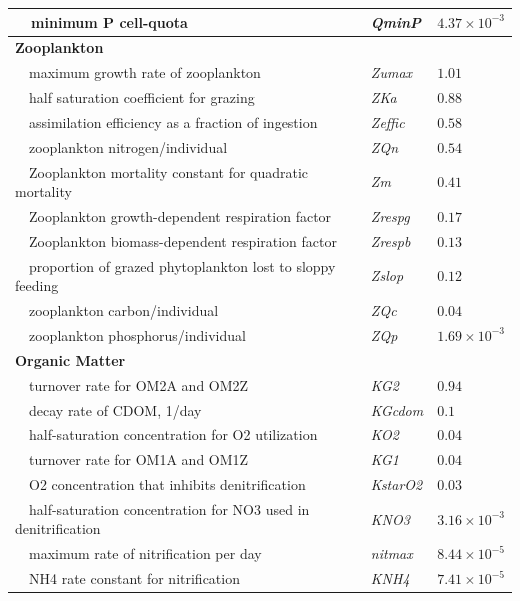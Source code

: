 \documentclass[preprint]{elsarticle}\usepackage[]{graphicx}\usepackage[]{color}
\begin{document}
\begin{table}[!tbp]
{\begin{center}
\begin{tabular}{lll}
~~minimum P cell-quota&\textit{QminP}&$4.37\times 10^{-3}$\tabularnewline
\hline
{\bfseries Zooplankton}&&\tabularnewline
~~maximum growth rate of zooplankton&\textit{Zumax}&$1.01$\tabularnewline
~~half saturation coefficient for grazing&\textit{ZKa}&$0.88$\tabularnewline
~~assimilation efficiency as a fraction of ingestion&\textit{Zeffic}&$0.58$\tabularnewline
~~zooplankton nitrogen/individual&\textit{ZQn}&$0.54$\tabularnewline
~~Zooplankton mortality constant for quadratic mortality&\textit{Zm}&$0.41$\tabularnewline
~~Zooplankton growth-dependent respiration factor&\textit{Zrespg}&$0.17$\tabularnewline
~~Zooplankton biomass-dependent respiration factor&\textit{Zrespb}&$0.13$\tabularnewline
~~proportion of grazed phytoplankton lost to sloppy feeding&\textit{Zslop}&$0.12$\tabularnewline
~~zooplankton carbon/individual&\textit{ZQc}&$0.04$\tabularnewline
~~zooplankton phosphorus/individual&\textit{ZQp}&$1.69\times 10^{-3}$\tabularnewline
\hline
{\bfseries Organic Matter}&&\tabularnewline
~~turnover rate for OM2A and OM2Z&\textit{KG2}&$0.94$\tabularnewline
~~decay rate of CDOM, 1/day&\textit{KGcdom}&$0.1$\tabularnewline
~~half-saturation concentration for O2 utilization&\textit{KO2}&$0.04$\tabularnewline
~~turnover rate for OM1A and OM1Z&\textit{KG1}&$0.04$\tabularnewline
~~O2 concentration that inhibits denitrification&\textit{KstarO2}&$0.03$\tabularnewline
~~half-saturation concentration for NO3 used in denitrification&\textit{KNO3}&$3.16\times 10^{-3}$\tabularnewline
~~maximum rate of nitrification per day&\textit{nitmax}&$8.44\times 10^{-5}$\tabularnewline
~~NH4 rate constant for nitrification&\textit{KNH4}&$7.41\times 10^{-5}$\tabularnewline
\hline
\end{tabular}\end{center}}
\end{table}
\end{document}
